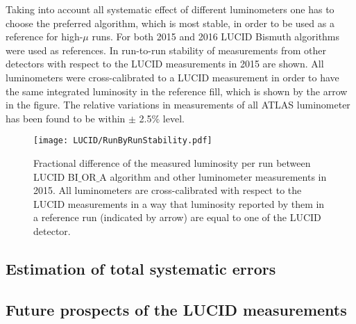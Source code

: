 
Taking into account all systematic effect of different luminometers one has to choose the preferred algorithm, which is most stable, in order to be used as a reference for high-$\mu$ runs.
For both 2015 and 2016 LUCID Bismuth algorithms were used as references. In  run-to-run stability of measurements from other detectors with respect to the 
LUCID measurements in 2015 are shown. 
All luminometers were cross-calibrated to a LUCID measurement in order to have the same integrated luminosity in the reference fill, which is shown by the arrow in the figure.
The relative variations in measurements of all ATLAS luminometer has been found to be within $\pm$ 2.5$\%$ level.

\begin{figure}
\centering
\texttt{[image: LUCID/RunByRunStability.pdf]}
\caption{
Fractional difference of the measured luminosity per run between LUCID BI$\_$OR$\_$A algorithm and other luminometer measurements in 2015.
All luminometers are cross-calibrated with respect to the LUCID measurements in a way that luminosity reported by them in a reference run (indicated by arrow) are
equal to one of the LUCID detector.
}
\label{fig:runByRunStability}
\end{figure}

\subsection{Estimation of total systematic errors}

\subsection{Future prospects of the LUCID measurements}

